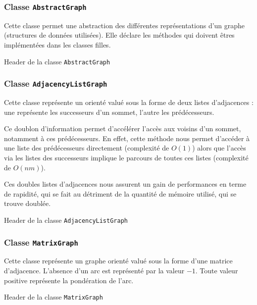 

\subsubsection{Classe \texttt{AbstractGraph}}

Cette classe permet une abstraction des différentes représentations d'un graphe (structures de données utilisées). Elle déclare les méthodes qui doivent êtres implémentées dans les classes filles.

Header de la classe \texttt{AbstractGraph}



\subsubsection{Classe \texttt{AdjacencyListGraph}}
Cette classe représente un orienté valué sous la forme
de deux listes d'adjacences : une représente les 
successeurs d'un sommet, l'autre les prédécesseurs.

Ce doublon d'information permet d'accélérer l'accès aux voisins d'un sommet, notamment à ces prédécesseurs. En effet, cette méthode nous permet d'accéder à une liste des prédécesseurs directement (complexité de $O(1)$) alors que l'accès via les listes des successeurs implique le parcours de toutes ces listes (complexité de $O(nm)$).

Ces doubles listes d'adjacences nous assurent un gain de performances en terme de rapidité, qui se fait au détriment de la quantité de mémoire utilisé, qui se trouve doublée.

Header de la classe \texttt{AdjacencyListGraph}




\subsubsection{Classe \texttt{MatrixGraph}}

Cette classe représente un graphe orienté valué sous la forme d'une matrice d'adjacence. L'absence d'un arc est représenté par la valeur $-1$. Toute valeur positive représente la pondération de l'arc.

Header de la classe \texttt{MatrixGraph}




